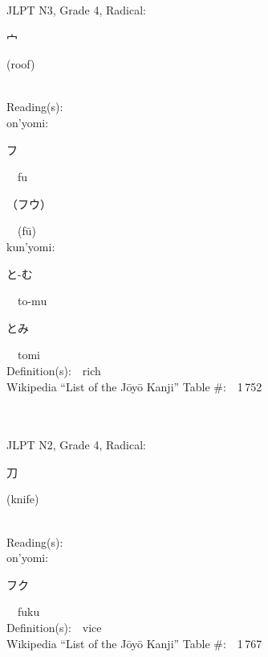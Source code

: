 \begin{multicols}{2}
{JLPT N3, Grade 4, Radical:\ \ {\begin{CJK}{UTF8}{min} 宀 \end{CJK}} (roof) } \\
Reading(s):\ \ \\
{\hspace*{1em}}on'yomi:\ \ \\
{\hspace*{2em}}{\begin{CJK}{UTF8}{min} フ \end{CJK}}\ \ fu\ \ \\
{\hspace*{2em}}{\begin{CJK}{UTF8}{min} （フウ） \end{CJK}}\ \ (f\=u)\ \ \\
{\hspace*{1em}}kun'yomi:\ \ \\
{\hspace*{2em}}{\begin{CJK}{UTF8}{min} と-む \end{CJK}}\ \ to-mu\ \ \\
{\hspace*{2em}}{\begin{CJK}{UTF8}{min} とみ \end{CJK}}\ \ tomi\ \ \\
Definition(s):\ \ rich \\
Wikipedia ``List of the J\=oy\=o Kanji'' Table \#:\ \ 1\,752 \\
\ \ \\
{\fontsize{34pt}{40pt}  }\ \ \\  %
{JLPT N2, Grade 4, Radical:\ \ {\begin{CJK}{UTF8}{min} 刀 \end{CJK}} (knife) } \\
Reading(s):\ \ \\
{\hspace*{1em}}on'yomi:\ \ \\
{\hspace*{2em}}{\begin{CJK}{UTF8}{min} フク \end{CJK}}\ \ fuku\ \ \\
Definition(s):\ \ vice \\
Wikipedia ``List of the J\=oy\=o Kanji'' Table \#:\ \ 1\,767 \\

\end{multicols}
